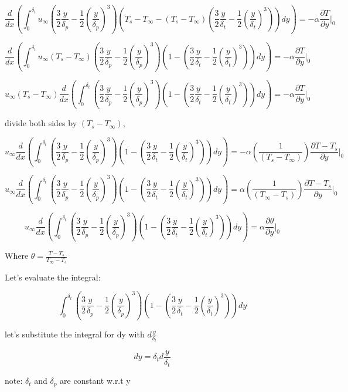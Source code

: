 \documentclass[11pt]{article}
\begin{document}
$$ \frac{d}{dx} \left( \int_{0}^{\delta_t} u_\infty(\frac{3}{2} \frac{y}{\delta_p} - \frac{1}{2} (\frac{y}{\delta_p})^3)(T_s-T_\infty - (T_s-T_\infty)(\frac{3}{2} \frac{y}{\delta_t} - \frac{1}{2} (\frac{y}{\delta_t})^3)) dy \right)  = - \alpha \frac{\partial T}{\partial y} |_0 $$ 

$$ \frac{d}{dx} \left( \int_{0}^{\delta_t} u_\infty(T_s-T_\infty )(\frac{3}{2} \frac{y}{\delta_p} - \frac{1}{2} (\frac{y}{\delta_p})^3)(1-(\frac{3}{2} \frac{y}{\delta_t} - \frac{1}{2} (\frac{y}{\delta_t})^3)) dy \right)  = - \alpha \frac{\partial T}{\partial y} |_0 $$ 

$$ u_\infty(T_s-T_\infty ) \frac{d}{dx} \left( \int_{0}^{\delta_t} (\frac{3}{2} \frac{y}{\delta_p} - \frac{1}{2} (\frac{y}{\delta_p})^3)(1-(\frac{3}{2} \frac{y}{\delta_t} - \frac{1}{2} (\frac{y}{\delta_t})^3)) dy \right)  = - \alpha \frac{\partial T}{\partial y} |_0 $$ 

divide both sides by $(T_s-T_\infty)$, 

$$ u_\infty \frac{d}{dx} \left( \int_{0}^{\delta_t} (\frac{3}{2} \frac{y}{\delta_p} - \frac{1}{2} (\frac{y}{\delta_p})^3)(1-(\frac{3}{2} \frac{y}{\delta_t} - \frac{1}{2} (\frac{y}{\delta_t})^3)) dy \right)  =  -\alpha (\frac{1}{(T_s-T_\infty )}) \frac{\partial T-T_s}{\partial y} |_0 $$ 

$$ u_\infty \frac{d}{dx} \left( \int_{0}^{\delta_t} (\frac{3}{2} \frac{y}{\delta_p} - \frac{1}{2} (\frac{y}{\delta_p})^3)(1-(\frac{3}{2} \frac{y}{\delta_t} - \frac{1}{2} (\frac{y}{\delta_t})^3)) dy \right)  =  \alpha (\frac{1}{(T_\infty- T_s )}) \frac{\partial T-T_s}{\partial y} |_0 $$ 



$$ u_\infty \frac{d}{dx} \left( \int_{0}^{\delta_t} (\frac{3}{2} \frac{y}{\delta_p} - \frac{1}{2} (\frac{y}{\delta_p})^3)(1-(\frac{3}{2} \frac{y}{\delta_t} - \frac{1}{2} (\frac{y}{\delta_t})^3)) dy \right)  = \alpha \frac{\partial \theta}{\partial y} |_0 $$ 

Where $\theta= \frac{T-T_s}{T_\infty-T_s}$

Let's evaluate the integral:

$$\int_{0}^{\delta_t} (\frac{3}{2} \frac{y}{\delta_p} - \frac{1}{2} (\frac{y}{\delta_p})^3)(1-(\frac{3}{2} \frac{y}{\delta_t} - \frac{1}{2} (\frac{y}{\delta_t})^3)) dy$$

let's substitute the integral for dy with $d \frac{y}{\delta_t}$

$$dy = \delta_t d \frac{y}{\delta_t}$$

note: $\delta_t$ and $\delta_p$ are constant w.r.t y
\end{document}
